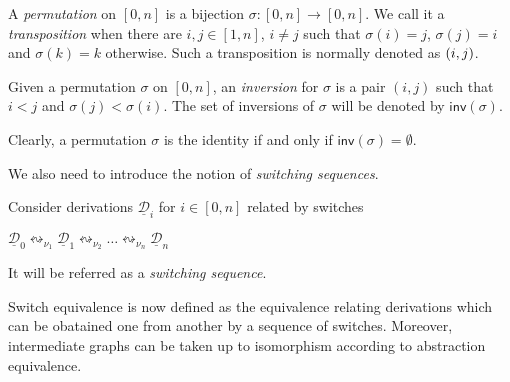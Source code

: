 \documentclass[a4paper,UKenglish,cleveref,pdftex,thm-restate,numberwithinsect,anonymous]{lipics}
\newcommand{\interval}[2][1]{\ensuremath{[{#1},{#2}]}}
\newcommand{\perm}{\sigma}
\newcommand{\dder}[1]{\mathscr{#1}}
\newcommand{\der}[1]{\underline{\dder{#1}}}
\newcommand{\inv}[1]{\mathsf{inv}({#1})}
\newcommand{\shift}[1]{\ensuremath{\mathrel{{\leftrightsquigarrow}_{#1}}}}
\begin{document}
\begin{definition}
  A \emph{permutation} on
  $\interval[0]{n}$ is a bijection
  $\sigma : \interval[0]{n} \to \interval[0]{n}$. We call it a
  \emph{transposition} when there are $i, j \in \interval{n}$,
  $i \neq j$ such that $\sigma(i)=j$, $\sigma(j) = i$ and
  $\sigma(k) = k$ otherwise. Such a transposition is normally denoted as
  $\transp{i}[j]$.
  
  Given a permutation $\perm$ on $\interval[0]{n}$, an
  \emph{inversion} for $\sigma$ is a pair $(i,j)$ such that $i<j$ and
  $\sigma(j)< \sigma(i)$. The set of inversions of $\perm$ will be
  denoted by $\inv{\sigma}$.
\end{definition}

\begin{remark}
  Clearly, a permutation $\perm$ is the identity if and only if
  $\inv{\perm}=\emptyset$.
\end{remark}



We also need to introduce the notion of \emph{switching sequences}.


\begin{definition}
  Consider derivations $\der{D}_i$ for $i \in \interval[0]{n}$
  related by switches
  \begin{center}
    $\der{D}_0 \shift{\nu_1} \der{D}_1 \shift{\nu_2} \ldots \shift{\nu_n}
    \der{D}_n$
  \end{center}
  It will be referred as a \emph{switching sequence}.  
\end{definition}

Switch equivalence is now defined as the equivalence relating derivations which can be obatained one from another by a sequence of switches. Moreover, intermediate graphs can be taken up to isomorphism according to abstraction equivalence.
\end{document}
